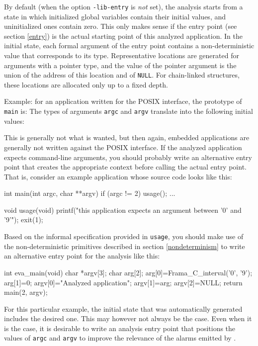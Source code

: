 \documentclass{frama-c-book}
\begin{document}
By default (when the option \lstinline|-lib-entry| is {\em not} set),
the analysis starts from a state
in which initialized global variables
contain their initial values, and uninitialized ones contain zero.
This only makes sense if the entry point (see section \ref{entry}) is
the actual starting point of this analyzed application.
In the initial state, each formal argument of the entry point contains
a non-deterministic value that corresponds to its type. Representative
locations are generated for arguments with a pointer type,
and the value of the pointer argument is the union of the address
of this location and of \lstinline|NULL|. For chain-linked structures,
these locations are allocated only up to a fixed depth.

Example: for an application written for the POSIX interface, the
prototype of \lstinline|main| is:
The types of arguments \lstinline|argc| and \lstinline|argv|
translate into the following initial values:

This is generally not what is wanted, but then again, embedded applications
are generally not written against the POSIX interface. If the analyzed
application expects command-line arguments, you should probably
write an alternative entry point that creates the appropriate context
before calling the actual entry point.
That is, consider an example application whose source code looks like this:
\begin{listing-nonumber}
int main(int argc, char **argv)
{
  if (argc != 2) usage();
  ...
}

void usage(void)
{
  printf("this application expects an argument between '0' and '9'\n");
  exit(1);
}
\end{listing-nonumber}

Based on the informal specification provided in \lstinline|usage|,
you should make use of the non-deterministic primitives described in
section \ref{nondeterminism} to write an alternative entry point
for the analysis like this:
\begin{listing-nonumber}
int eva_main(void)
{
  char *argv[3];
  char arg[2];
  arg[0]=Frama_C_interval('0', '9');
  arg[1]=0;
  argv[0]="Analyzed application";
  argv[1]=arg;
  argv[2]=NULL;
  return main(2, argv);
}
\end{listing-nonumber}

For this particular example, the initial state that was
automatically generated includes the desired one. This may however
not always be the case. Even when it is the case, it is desirable
to write an analysis entry point that positions the
values of \lstinline|argc| and \lstinline|argv| to
improve the relevance of the alarms emitted by \Eva{}.
\end{document}
